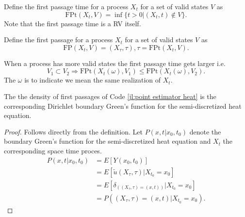 \documentclass[a4paper,12pt]{article}
\begin{document}
\begin{definition} \label{def:first passage time}
  Define the first passage time for a process $X_{t}$ for a set of valid states
  $V$ as
  \begin{equation}
    \text{FPt}(X_{t},V)=\inf \{t>0| (X_{t},t) \notin V \}
    .
  \end{equation}
  Note that the first passage time is a RV itself.
\end{definition}

\begin{definition} \label{def:first passage}
  Define the first passage for a process $X_{t}$ for a set of valid states
  $V$ as
  \begin{equation}
    \text{FP}(X_{t},V)=(X_{\tau},\tau), \tau = \text{FPt}(X_{t},V)
    .
  \end{equation}
\end{definition}

\begin{lemma} \label{lem: FP order}
  When a process has more valid states the first passage time gets larger i.e.
  \begin{equation}
    V_{1} \subset V_{2} \Rightarrow
    \text{FPt}(X_{t}(\omega),V_{1}) \le  \text{FPt}(X_{t}(\omega),V_{2}) .
  \end{equation}
  The $\omega$ is to indicate we mean the same realization of $X_{t}$.
\end{lemma}

\begin{theorem}
  The the density of first passages of Code \ref{jl:point estimator heat} is  the
  corresponding Dirichlet boundary Green's function for the semi-discretized heat equation.
\end{theorem}

\begin{proof}
  Follows directly from the definition.
  Let $P(x,t|x_{0},t_{0})$ denote the boundary Green's
  function for the semi-discretized heat equation and $X_{t}$
  the corresponding space time proces.
  \begin{align}
    P(x,t|x_{0},t_{0}) & = E[Y(x_0,t_0)]                                         \\
                       & = E[\tilde{u}(X_{\tau},\tau) | X_{t_0} = x_0 ]          \\
                       & = E[\delta_{((X_{\tau},\tau) = (x,t))}| X_{t_0} = x_0 ] \\
                       & = P((X_{\tau},\tau) = (x,t)| X_{t_0} = x_0 )
    .
  \end{align}
\end{proof}
\end{document}

